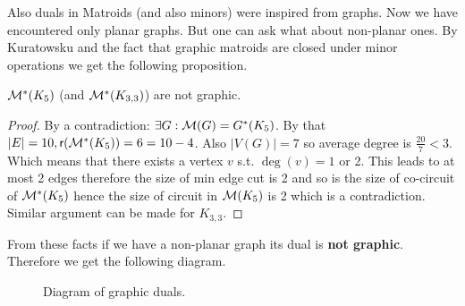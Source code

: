 Also duals in Matroids (and also minors) were inspired from graphs. Now we have encountered only planar graphs. But one can ask what about non-planar ones. By Kuratowsku and the fact that graphic matroids are closed under minor operations we get the following proposition.

\begin{prop}
	$\dual{\M}(K_5)$ (and $\dual{\M}(K_{3,3})$) are not graphic.
\end{prop}

\begin{proof}
	By a contradiction: $\exists G : \M(G) = \dual{G}(K_5)$. By that $|E| = 10, \rank(\dual{\M}(K_5)) = 6 = 10 -4$. Also $|V(G)| = 7$ so average degree is $\frac{20}{7} < 3$. Which means that there exists a vertex $v$ s.t. $\deg(v) = 1$ or 2. This leads to at most 2 edges therefore the size of min edge cut is 2 and so is the size of co-circuit of $\dual{\M}(K_5)$ hence the size of circuit in $\M(K_5)$ is 2 which is a contradiction. Similar argument can be made for $K_{3,3}$.
\end{proof}

From these facts if we have a non-planar graph its dual is \textbf{not graphic}. Therefore we get the following diagram.

\begin{figure}[!ht]\centering
	\begin{tikzpicture}
		
	\end{tikzpicture}
	\caption{Diagram of graphic duals.}
\end{figure}